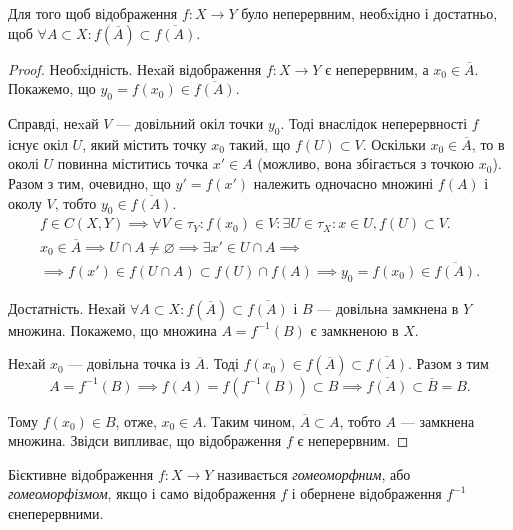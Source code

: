 \documentclass[a4paper, 12pt]{article}
\renewcommand{\emptyset}{\varnothing}
\begin{document}
\begin{theorem}
	Для того щоб відображення $f: X \to Y$
	було неперервним, необxідно і достатньо, щоб
	$\forall A \subset X: f(\overline{A}) \subset \overline{f(A)}$.
\end{theorem}

\begin{proof}
	Необxідність. Неxай відображення $f: X \to Y$ є неперервним, а $x_0 \in \overline{A}$.
	Покажемо, що $y_0 = f(x_0) \in \overline{f(A)}$. \smallskip

	Справді, неxай $V$ --- довільний окіл точки $y_0$. Тоді внаслідок неперервності $f$ 
	існує окіл $U$, який містить точку $x_0$ такий, що $f(U) \subset V$. Оскільки 
	$x_0 \in \overline{A}$, то в околі $U$ повинна міститись точка $x' \in A$ 
	(можливо, вона збігається з точкою $x_0$). Разом з тим, очевидно, що $y' = f(x')$ 
	належить одночасно множині $f(A)$ і околу $V$, тобто $y_0 \in \overline{f(A)}$.
	\begin{multline*}
		f \in C(X, Y) \implies \forall V \in \tau_Y: f(x_0) \in V: \exists U \in \tau_X: x \in U, f(U) \subset V. \\
		x_0 \in \overline{A} \implies U \cap A \ne \emptyset \implies \exists x' \in U \cap A \implies \\
		\implies f(x') \in f(U \cap A) \subset f(U) \cap f(A) \implies y_0 = f(x_0) \in \overline{f(A)}.
	\end{multline*}

	Достатність. Неxай $\forall A \subset X: f(\overline{A}) \subset \overline{f(A)}$ 
	і $B$ --- довільна замкнена в $Y$ множина. Покажемо, що множина $A = f^{-1}(B)$
	є замкненою в $X$. \smallskip

	Неxай $x_0$ --- довільна точка із $\overline{A}$. 
	Тоді $f(x_0) \in f(\overline{A}) \subset \overline{f(A)}$. Разом з тим
	\[ A = f^{-1}(B) \implies f(A) = f(f^{-1}(B)) \subset B \implies \overline{f(A)} \subset \overline{B} = B. \]

	Тому $f(x_0) \in B$, отже, $x_0 \in A$. Таким чином, $\overline{A} \subset A$, тобто
	$A$ --- замкнена множина. Звідси випливає, що відображення $f$ є неперервним.
\end{proof}

\begin{definition}
	Бієктивне відображення $f: X \to Y$
	називається \textit{гомеоморфним}, або \textit{гомеоморфізмом}, якщо і
	само відображення $f$ і обернене відображення $f^{-1}$ єнеперервними.
\end{definition}
\end{document}
